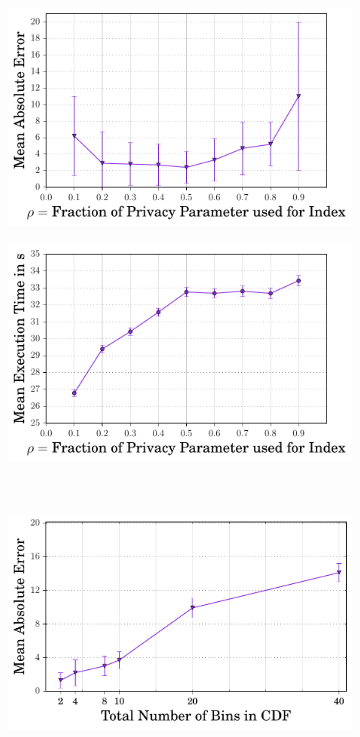  \begin{figure}[ht]
   \begin{subfigure}[b]{0.45\linewidth}
    \centering \includegraphics[width=1\linewidth]{index_error.pdf}
        \caption{}
        \label{fig:error}\end{subfigure}
        \begin{subfigure}[b]{0.45\linewidth}
        \includegraphics[width=1\linewidth]{index_time.pdf}
        \caption{}
        \label{fig:time}
        \end{subfigure}
        \\
         \begin{subfigure}[b]{0.45\linewidth}
    \centering \includegraphics[width=1\linewidth]{index_numberOfBins_error.pdf}

\end{subfigure}
\end{figure}
